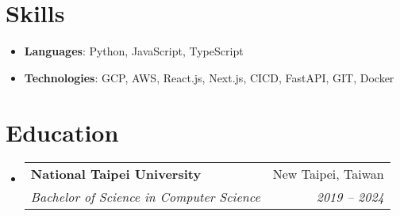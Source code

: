 \documentclass[letterpaper,11pt]{article}
\makeatletter
\newcommand{\resumeSubheading}[4]{
  \vspace{-1pt}\item
    \begin{tabular*}{0.97\textwidth}[t]{l@{\extracolsep{\fill}}r}
      \textbf{#1} & #2 \\
      \textit{\small#3} & \textit{\small #4} \\
    \end{tabular*}\vspace{-5pt}
}
\newcommand{\resumeSubHeadingListStart}{\begin{itemize}[leftmargin=*]}
\newcommand{\resumeSubHeadingListEnd}{\end{itemize}}
\makeatother
\begin{document}
%
\section{Skills}
 \resumeSubHeadingListStart
   \item{
     \textbf{Languages}{: Python, JavaScript, TypeScript}
   }
 \resumeSubHeadingListEnd
 \resumeSubHeadingListStart
   \item{
     \textbf{Technologies}{: GCP, AWS, React.js, Next.js, CICD, FastAPI, GIT, Docker}
   }
 \resumeSubHeadingListEnd

\section{Education}
\resumeSubHeadingListStart
  \resumeSubheading
    {National Taipei University}{New Taipei, Taiwan}
    {Bachelor of Science in Computer Science}{2019 -- 2024}
\resumeSubHeadingListEnd


\end{document}
